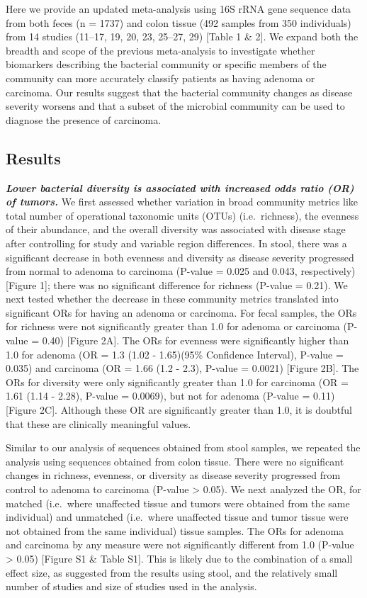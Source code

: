 \documentclass[12pt,]{article}
\begin{document}
Here we provide an updated meta-analysis using 16S rRNA gene sequence
data from both feces (n = 1737) and colon tissue (492 samples from 350
individuals) from 14 studies (11--17, 19, 20, 23, 25--27, 29) {[}Table 1
\& 2{]}. We expand both the breadth and scope of the previous
meta-analysis to investigate whether biomarkers describing the bacterial
community or specific members of the community can more accurately
classify patients as having adenoma or carcinoma. Our results suggest
that the bacterial community changes as disease severity worsens and
that a subset of the microbial community can be used to diagnose the
presence of carcinoma.

\newpage

\subsection{Results}\label{results}

\textbf{\emph{Lower bacterial diversity is associated with increased
odds ratio (OR) of tumors.}} We first assessed whether variation in
broad community metrics like total number of operational taxonomic units
(OTUs) (i.e.~richness), the evenness of their abundance, and the overall
diversity was associated with disease stage after controlling for study
and variable region differences. In stool, there was a significant
decrease in both evenness and diversity as disease severity progressed
from normal to adenoma to carcinoma (P-value = 0.025 and 0.043,
respectively) {[}Figure 1{]}; there was no significant difference for
richness (P-value = 0.21). We next tested whether the decrease in these
community metrics translated into significant ORs for having an adenoma
or carcinoma. For fecal samples, the ORs for richness were not
significantly greater than 1.0 for adenoma or carcinoma (P-value = 0.40)
{[}Figure 2A{]}. The ORs for evenness were significantly higher than 1.0
for adenoma (OR = 1.3 (1.02 - 1.65)(95\% Confidence Interval), P-value =
0.035) and carcinoma (OR = 1.66 (1.2 - 2.3), P-value = 0.0021) {[}Figure
2B{]}. The ORs for diversity were only significantly greater than 1.0
for carcinoma (OR = 1.61 (1.14 - 2.28), P-value = 0.0069), but not for
adenoma (P-value = 0.11) {[}Figure 2C{]}. Although these OR are
significantly greater than 1.0, it is doubtful that these are clinically
meaningful values.

Similar to our analysis of sequences obtained from stool samples, we
repeated the analysis using sequences obtained from colon tissue. There
were no significant changes in richness, evenness, or diversity as
disease severity progressed from control to adenoma to carcinoma
(P-value \textgreater{} 0.05). We next analyzed the OR, for matched
(i.e.~where unaffected tissue and tumors were obtained from the same
individual) and unmatched (i.e.~where unaffected tissue and tumor tissue
were not obtained from the same individual) tissue samples. The ORs for
adenoma and carcinoma by any measure were not significantly different
from 1.0 (P-value \textgreater{} 0.05) {[}Figure S1 \& Table S1{]}. This
is likely due to the combination of a small effect size, as suggested
from the results using stool, and the relatively small number of studies
and size of studies used in the analysis.
\end{document}
